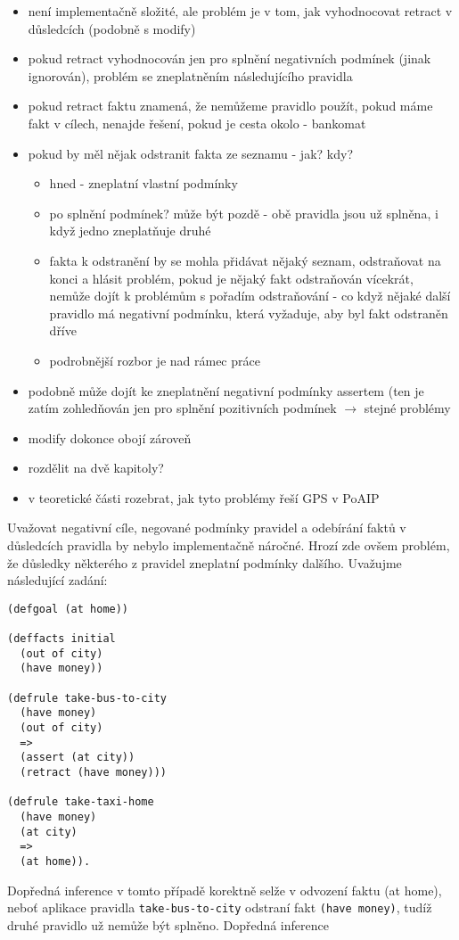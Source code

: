 \begin{framed}
  \begin{itemize}
    \item není implementačně složité, ale problém je v tom, jak vyhodnocovat
      retract v důsledcích (podobně s modify)
    \item pokud retract vyhodnocován jen pro splnění negativních podmínek (jinak
      ignorován), problém se zneplatněním následujícího pravidla
    \item pokud retract faktu znamená, že nemůžeme pravidlo použít, pokud máme
      fakt v cílech, nenajde řešení, pokud je cesta okolo - bankomat
    \item pokud by měl nějak odstranit fakta ze seznamu - jak? kdy?
      \begin{itemize}
        \item hned - zneplatní vlastní podmínky
        \item po splnění podmínek? může být pozdě - obě pravidla jsou už
          splněna, i když jedno zneplatňuje druhé
        \item fakta k odstranění by se mohla přidávat nějaký seznam, odstraňovat
          na konci a hlásit problém, pokud je nějaký fakt odstraňován vícekrát,
          nemůže dojít k problémům s pořadím odstraňování - co když nějaké další
          pravidlo má negativní podmínku, která vyžaduje, aby byl fakt odstraněn
          dříve
        \item podrobnější rozbor je nad rámec práce
      \end{itemize}
    \item podobně může dojít ke zneplatnění negativní podmínky assertem (ten je
      zatím zohledňován jen pro splnění pozitivních podmínek $\rightarrow$
      stejné problémy
    \item modify dokonce obojí zároveň
    \item rozdělit na dvě kapitoly?
    \item v teoretické části rozebrat, jak tyto problémy řeší GPS v PoAIP
  \end{itemize}
\end{framed}

Uvažovat negativní cíle, negované podmínky pravidel a odebírání faktů v
důsledcích pravidla by nebylo implementačně náročné. Hrozí zde ovšem problém, že
důsledky některého z pravidel zneplatní podmínky dalšího. Uvažujme následující
zadání:
\begin{verbatim}
(defgoal (at home))

(deffacts initial
  (out of city)
  (have money))

(defrule take-bus-to-city
  (have money)
  (out of city)
  =>
  (assert (at city))
  (retract (have money)))

(defrule take-taxi-home
  (have money)
  (at city)
  =>
  (at home)).
\end{verbatim}
Dopředná inference v tomto případě korektně selže v odvození faktu (at home),
neboť aplikace pravidla \verb|take-bus-to-city| odstraní fakt
\verb|(have money)|, tudíž druhé pravidlo už nemůže být splněno. Dopředná
inference

